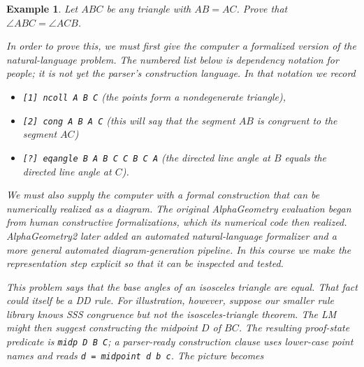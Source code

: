 \documentclass[reqno]{amsart}
\DeclareMathOperator{\1}{\textbf{1}}
\newtheorem{example}[thm]{Example}
\begin{document}
\begin{example}
    Let $ABC$ be any triangle with $AB = AC$. Prove that $\angle ABC = \angle
    ACB$.

    In order to prove this, we must first give the computer a formalized version
    of the natural-language problem.  The numbered list below is dependency
    notation for people; it is not yet the parser's construction language.  In
    that notation we record
    \begin{itemize}
        \item \verb|[1] ncoll A B C| (the points form a nondegenerate triangle),
        \item \verb|[2] cong A B A C| (this will say that the segment $AB$ is congruent to the segment $AC$)
        \item \verb|[?] eqangle B A B C C B C A| (the directed line angle at $B$ equals the directed line angle at $C$).
    \end{itemize}
    We must also supply the computer with a formal construction that can be
    numerically realized as a diagram.  The original AlphaGeometry evaluation
    began from human constructive formalizations, which its numerical code
    then realized. AlphaGeometry2 later added an automated natural-language
    formalizer and a more general automated diagram-generation pipeline. In
    this course we make the representation step explicit so that it can be
    inspected and tested.
    \begin{center}
\end{center}
This problem says that the base angles of an isosceles triangle are equal.
That fact could itself be a DD rule.  For illustration, however, suppose our
smaller rule library knows SSS congruence but not the isosceles-triangle
theorem.  The LM might then suggest constructing the midpoint $D$ of $BC$.
The resulting proof-state predicate is \verb|midp D B C|; a parser-ready
construction clause uses lower-case point names and reads
\verb|d = midpoint d b c|.  The picture becomes


\end{example}
\end{document}
